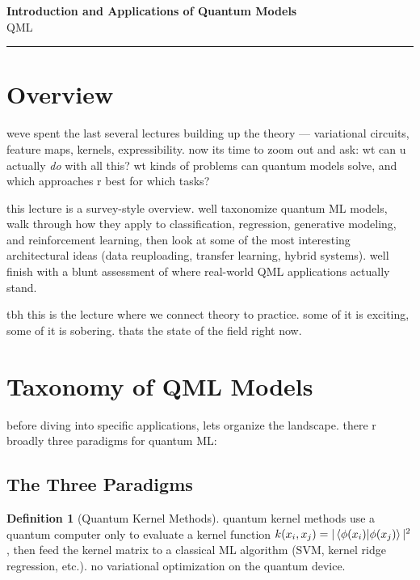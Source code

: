 \documentclass[11pt,a4paper]{article}
\theoremstyle{definition}
\newtheorem{definition}{Definition}[section]
\theoremstyle{remark}
\begin{document}
\begin{center}
    {\LARGE \textbf{Introduction and Applications of Quantum Models}}\\[8pt]
    {\large QML}\\[12pt]
    \hrule
\end{center}

\vspace{12pt}
\tableofcontents
\newpage

\section{Overview}

weve spent the last several lectures building up the theory --- variational circuits, feature maps, kernels, expressibility. now its time to zoom out and ask: wt can u actually \emph{do} with all this? wt kinds of problems can quantum models solve, and which approaches r best for which tasks?

this lecture is a survey-style overview. well taxonomize quantum ML models, walk through how they apply to classification, regression, generative modeling, and reinforcement learning, then look at some of the most interesting architectural ideas (data reuploading, transfer learning, hybrid systems). well finish with a blunt assessment of where real-world QML applications actually stand.

tbh this is the lecture where we connect theory to practice. some of it is exciting, some of it is sobering. thats the state of the field right now.

\section{Taxonomy of QML Models}

before diving into specific applications, lets organize the landscape. there r broadly three paradigms for quantum ML:

\subsection{The Three Paradigms}

\begin{definition}[Quantum Kernel Methods]
quantum kernel methods use a quantum computer only to evaluate a kernel function $k(x_i, x_j) = |\braket{\phi(x_i)|\phi(x_j)}|^2$, then feed the kernel matrix to a classical ML algorithm (SVM, kernel ridge regression, etc.). no variational optimization on the quantum device.
\end{definition}
\end{document}
